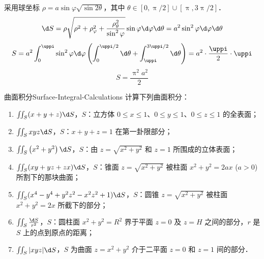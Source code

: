 \begin{solution}

    采用球坐标 $\rho = a \sin \varphi \sqrt{\sin 2\theta}$，其中 $\theta \in [0, \uppi/2] \cup [\uppi, 3\uppi/2]$．
    \begin{equation}
        \d S = \rho \sqrt{\rho^2 + \rho_\varphi^2 + \frac{\rho_\theta^2}{\sin^2 \varphi}} \sin \varphi \d \varphi \d \theta = a^2 \sin^2 \varphi \d \varphi \d \theta
    \end{equation}
    \begin{equation}
        S = a^2 \int_0^{\uppi} \sin^2 \varphi \d \varphi \left( \int_0^{\uppi/2} \d \theta + \int_{\uppi}^{3\uppi/2} \d \theta \right) = a^2 \cdot \frac{\uppi}{2} \cdot \uppi
    \end{equation}
    \begin{equation}
        \boxed{S = \frac{\uppi^2 a^2}{2}}
    \end{equation}
\end{solution}

\begin{problem}{曲面积分}{Surface-Integral-Calculations}
    计算下列曲面积分：
    \begin{enumerate}
        \item $\iint_{S}(x+y+z) \d S$，$S$：立方体 $0 \leqslant x \leqslant 1$、$0 \leqslant y \leqslant 1$、$0 \leqslant z \leqslant 1$ 的全表面；
        \item $\iint_{S} x y z \d S$，$S$：$x+y+z=1$ 在第一卦限部分；
        \item $\iint_{S}\left(x^{2}+y^{2}\right) \d S$，$S$：由 $z=\sqrt{x^{2}+y^{2}}$ 和 $z=1$ 所围成的立体表面；
        \item $\iint_{S}(x y+y z+z x) \d S$，$S$：锥面 $z=\sqrt{x^{2}+y^{2}}$ 被柱面 $x^{2}+y^{2}=2 a x$ ($a>0$) 所割下的那块曲面；
        \item $\iint_{S}(x^{4}-y^{4}+y^{2} z^{2}-x^{2} z^{2}+1) \d S$，$S$：圆锥 $z=\sqrt{x^{2}+y^{2}}$ 被柱面 $x^{2}+y^{2}=2 x$ 所截下的部分；
        \item $\iint_{S} \frac{\d S}{r^{2}}$，$S$：圆柱面 $x^{2}+y^{2}=R^{2}$ 界于平面 $z=0$ 及 $z=H$ 之间的部分，$r$ 是 $S$ 上的点到原点的距离；
        \item $\iint_{S}|x y z| \d S$，$S$ 为曲面 $z=x^{2}+y^{2}$ 介于二平面 $z=0$ 和 $z=1$ 间的部分．
    \end{enumerate}
\end{problem}


